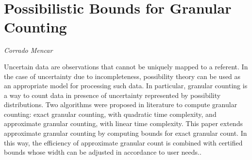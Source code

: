 \documentclass[../booklet.tex]{subfiles}
\begin{document}
\section[Possibilistic Bounds for Granular Counting. {\it Corrado Mencar}]{Possibilistic Bounds for Granular Counting}

\begin{center}
  {\it Corrado Mencar}
\end{center}

\vskip 0.8cm


Uncertain data are observations that cannot be uniquely mapped to
a referent. In the case of uncertainty due to incompleteness, possibility
theory can be used as an appropriate model for processing such data.
In particular, granular counting is a way to count data in presence
of uncertainty represented by possibility distributions. Two algorithms
were proposed in literature to compute granular counting: exact granular
counting, with quadratic time complexity, and approximate granular
counting, with linear time complexity. This paper extends approximate
granular counting by computing bounds for exact granular count. In
this way, the efficiency of approximate granular count is combined
with certified bounds whose width can be adjusted in accordance to
user needs..
\end{document}
